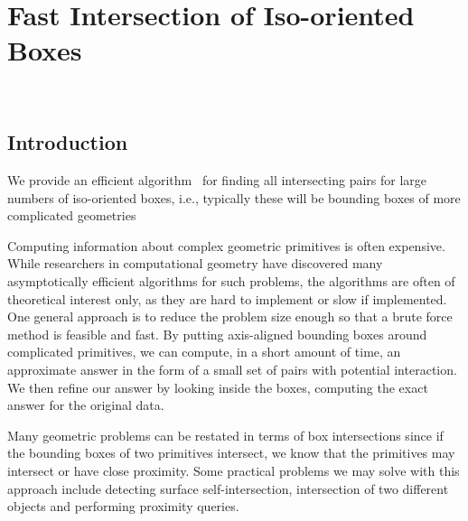 
\newcommand{\LK}[1]{\textbf{L.K.:#1???}}

\ccParDims

\chapter{Fast Intersection of Iso-oriented Boxes}
\label{chapterBoxIntersection}
\\


\section{Introduction}

We provide an efficient algorithm~\cite{cgal:ze-fsbi-02} for finding all
intersecting pairs for large numbers of iso-oriented boxes, i.e.,
typically these will be bounding boxes of more complicated geometries

Computing information about complex geometric primitives is often
expensive. While researchers in computational geometry have discovered
many asymptotically efficient algorithms for such problems, the
algorithms are often of theoretical interest only, as they are hard to
implement or slow if implemented. One general approach is to reduce
the problem size enough so that a brute force method is feasible and
fast. By putting axis-aligned bounding boxes around complicated
primitives, we can compute, in a short amount of time, an approximate
answer in the form of a small set of pairs with potential interaction.
We then refine our answer by looking inside the boxes, computing the
exact answer for the original data.

Many geometric problems can be restated in terms of box intersections
since if the bounding boxes of two primitives intersect, we know that
the primitives may intersect or have close proximity. Some practical
problems we may solve with this approach include detecting surface
self-intersection, intersection of two different objects and
performing proximity queries.


